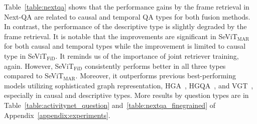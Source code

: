 \documentclass{article}
\newcommand{\frameworkname}{SeViT}
\begin{document}
Table~\ref{table:nextqa} shows that the performance gains by the frame retrieval in Next-QA are related to causal and temporal QA types for both fusion methods. In contrast, the performance of the descriptive type is slightly degraded by the frame retrieval. It is notable that the improvements are significant in \frameworkname{}$_\text{MAR}$ for both causal and temporal types while the improvement is limited to causal type in \frameworkname{}$_\text{FiD}$. It reminds us of the importance of joint retriever training, again. However, \frameworkname{}$_\text{FiD}$ consistently performs better in all three types compared to \frameworkname{}$_\text{MAR}$. Moreover, it outperforms previous best-performing models utilizing sophisticated graph representation, HGA~\cite{jiang2020reasoning}, HGQA~\cite{xiao2022video}, and VGT~\cite{xiao2022videotransformer}, especially in causal and descriptive types. More results by question types are in Table~\ref{table:activitynet_question} and~\ref{table:nextqa_finegrained} of Appendix~\ref{appendix:experiments}.
\end{document}
